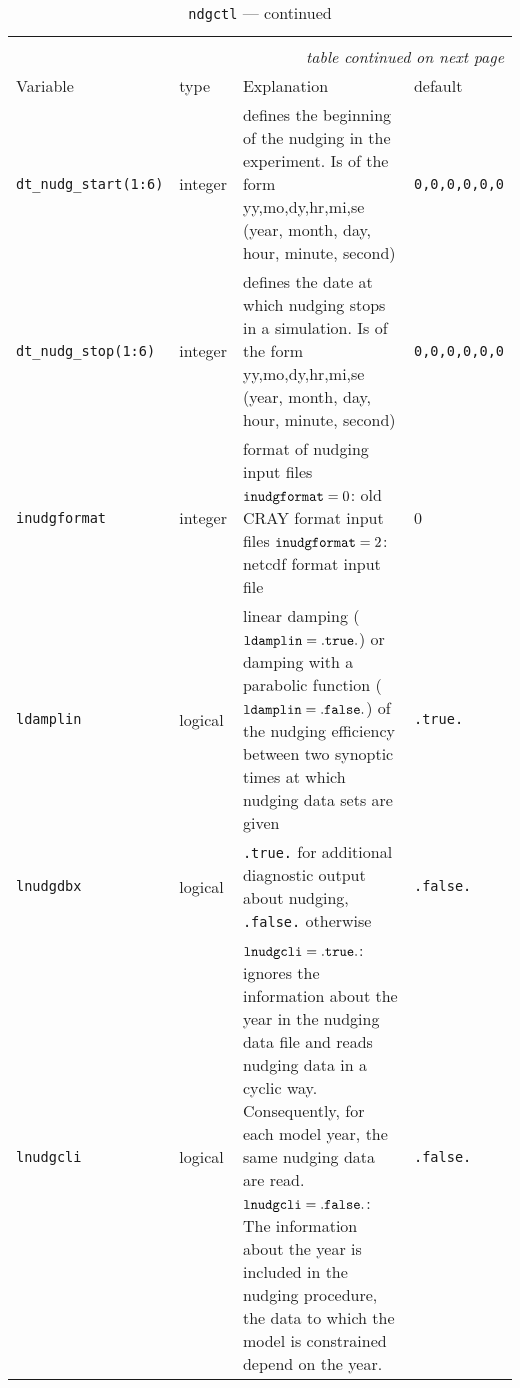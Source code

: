 \begin{longtable}{l@{\extracolsep\fill}lp{7cm}p{3.5cm}}\hline\hline
\caption[Namelist {\tt ndgctl}]{Namelist 
  {\tt ndgctl}}\\\hline\label{tabndgctl}
\endfirsthead
\caption[]{{\tt ndgctl} --- continued}\\\hline
\endhead
\hline\multicolumn{4}{r}{\slshape table continued on next page}\\
\endfoot
\hline %
\endlastfoot
Variable & type & Explanation & default \\\hline
{\tt dt\_nudg\_start(1:6)}\index{namelist variables!dt\_nudg\_start}
 & integer    & defines the beginning of the nudging 
 in the experiment. Is of the form yy,mo,dy,hr,mi,se (year, month,
 day, hour, minute, second) & {\tt 0,0,0,0,0,0} \\
{\tt dt\_nudg\_stop(1:6)}\index{namelist variables!dt\_nudg\_stop}
 & integer     &  defines the
  date at which nudging stops in a simulation. Is of the form
  yy,mo,dy,hr,mi,se (year, month, 
  day, hour, minute, second) & {\tt 0,0,0,0,0,0} \\
{\tt inudgformat}\index{namelist variables!inudgformat}
 & integer & format of nudging input files \newline
${\tt inudgformat}=0$: old CRAY format input files \newline
${\tt inudgformat}=2$: netcdf format input file & 0 \\
{\tt ldamplin}\index{namelist variables!ldamplin}
 & logical & linear damping (${\tt ldamplin}={\tt
 .true.}$) or damping with a parabolic function (${\tt ldamplin}={\tt
 .false.}$) 
 of the nudging efficiency
 between two synoptic times at
 which nudging data sets are given
 & {\tt .true.} \\
{\tt lnudgdbx}\index{namelist variables!lnudgdbx}
 & logical  & {\tt .true.} for additional diagnostic output
 about nudging, {\tt .false.} otherwise& {\tt .false.}\\
{\tt lnudgcli}\index{namelist variables!lnudgcli}
 & logical & ${\tt lnudgcli}={\tt .true.}$: \echam{}
 ignores the information about the year in the 
 nudging data file and reads nudging data in a cyclic way. Consequently,
 for each model year, the same nudging data are read.\newline
 ${\tt lnudgcli}={\tt .false.}$: The information about the year is
 included in the 
 nudging procedure, the data to which the model is constrained depend
 on the year. & {\tt .false.} \\

\end{longtable}
